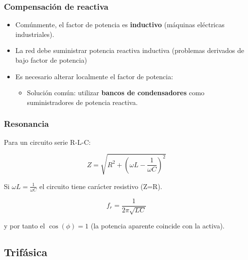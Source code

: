 \documentclass[serif, xcolor=dvipsnames]{beamer}
\begin{document}
\begin{frame}
  \frametitle{Compensación de reactiva}
  \begin{itemize}
  \item Comúnmente, el factor de potencia es \textbf{inductivo}
    (máquinas eléctricas industriales).
  \item La red debe suministrar potencia reactiva inductiva (problemas
    derivados de bajo factor de potencia)
  \item Es necesario alterar localmente el factor de potencia:

    \begin{itemize}
    \item Solución común: utilizar \textbf{bancos de condensadores}
      como suministradores de potencia reactiva.
    \end{itemize}
  \end{itemize}

\end{frame}
\begin{frame}
  \frametitle{Resonancia}

  Para un circuito serie R-L-C:

\[
Z=\sqrt{R^{2}+\left(\omega L-\frac{1}{\omega C}\right)^{2}}
\]


Si $\omega L=\frac{1}{\omega C}$ el circuito tiene carácter resistivo
(Z=R).

\[
f_{r}=\frac{1}{2\pi\sqrt{LC}}
\]


y por tanto el $\cos(\phi)=1$ (la potencia aparente coincide con la
activa).


\end{frame}
\subsection{Trifásica}
\end{document}
